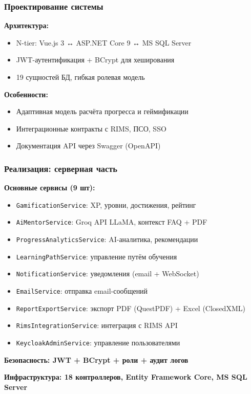 \documentclass{beamer}
\begin{document}
\begin{frame}
    \frametitle{Проектирование системы}
    
    \textbf{Архитектура:}
    \begin{itemize}
        \item N-tier: Vue.js 3 ↔ ASP.NET Core 9 ↔ MS SQL Server
        \item JWT-аутентификация + BCrypt для хеширования
        \item 19 сущностей БД, гибкая ролевая модель
    \end{itemize}
    
    \vspace{0.3cm}
    \textbf{Особенности:}
    \begin{itemize}
        \item Адаптивная модель расчёта прогресса и геймификации
        \item Интеграционные контракты с RIMS, ПСО, SSO
        \item Документация API через Swagger (OpenAPI)
    \end{itemize}
\end{frame}

\begin{frame}
    \frametitle{Реализация: серверная часть}
    
    \textbf{Основные сервисы (9 шт):}
    \begin{itemize}
        \item \texttt{GamificationService}: XP, уровни, достижения, рейтинг
        \item \texttt{AiMentorService}: Groq API LLaMA, контекст FAQ + PDF
        \item \texttt{ProgressAnalyticsService}: AI-аналитика, рекомендации
        \item \texttt{LearningPathService}: управление путём обучения
        \item \texttt{NotificationService}: уведомления (email + WebSocket)
        \item \texttt{EmailService}: отправка email-сообщений
        \item \texttt{ReportExportService}: экспорт PDF (QuestPDF) + Excel (ClosedXML)
        \item \texttt{RimsIntegrationService}: интеграция с RIMS API
        \item \texttt{KeycloakAdminService}: управление пользователями
    \end{itemize}
    
    \vspace{0.15cm}
    \textbf{Безопасность: JWT + BCrypt + роли + аудит логов}
    
    \vspace{0.15cm}
    \textbf{Инфраструктура: 18 контроллеров, Entity Framework Core, MS SQL Server}
\end{frame}
\end{document}
